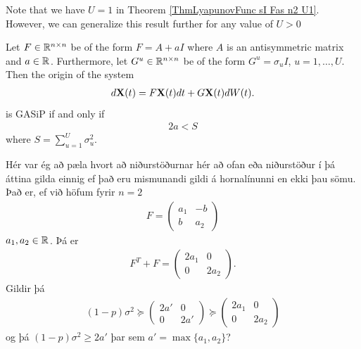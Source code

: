 \documentclass[a4paper,12pt,twoside,BCOR=10mm]{scrbook}
\begin{document}
Note that we have $U = 1$ in Theorem \ref{ThmLyapunovFunc sI Fas n2 U1}. However, we can generalize this result further for any value of $U > 0$

\fi
\begin{theorem}
Let $F\in \mathbb{R}^{n\times n}$ be of the form $F = A + aI$ where $A$ is an antisymmetric matrix and $a \in \mathbb{R}^{}$. Furthermore, let $G^u \in \mathbb{R}^{n\times n}$ be of the form $G^u = \sigma_u I$, $u = 1,\ldots, U$. Then the origin of the system
\begin{align*}
    d\mathbf{X}(t) = F\mathbf{X}(t)dt + G\mathbf{X}(t)dW(t).
\end{align*}
is GASiP if and only if
\begin{align*}
    2a < S
\end{align*}
where $S = \sum\limits_{u = 1}^U \sigma_u^2$.
\end{theorem}

\if
Hér var ég að pæla hvort að niðurstöðurnar hér að ofan eða niðurstöður í þá áttina gilda einnig ef það eru mismunandi gildi á hornalínunni en ekki þau sömu. Það er, ef við höfum fyrir $n = 2$
\begin{align*}
    F = \begin{pmatrix}
    a_1 & -b\\
    b & a_2
    \end{pmatrix}
\end{align*}
$a_1, a_2 \in \mathbb{R}^{}$. Þá er
\begin{align*}
    F^T + F = \begin{pmatrix}
    2a_1 & 0\\
    0 & 2a_2
    \end{pmatrix}.
\end{align*}
Gildir þá
\begin{align*}
    (1 - p)\sigma^2 \succeq \begin{pmatrix}
    2a' & 0\\
    0 & 2a'
    \end{pmatrix}
    \succeq
    \begin{pmatrix}
    2a_1 & 0\\
    0 & 2a_2
    \end{pmatrix}
\end{align*}
og þá $(1 - p)\sigma^2 \geq 2a'$ þar sem $a' = \max\{a_1, a_2\}$?
\fi
\end{document}
